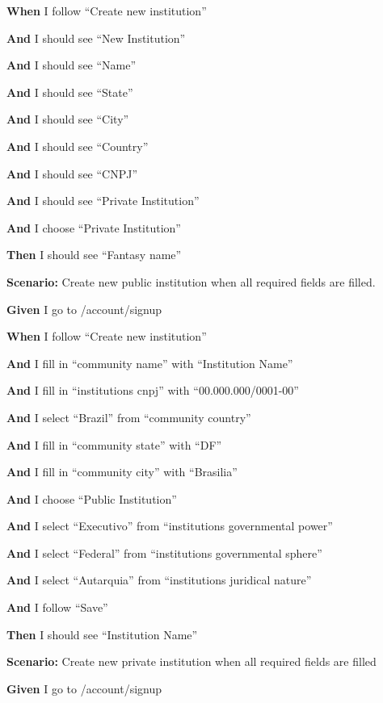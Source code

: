     \textbf{When} I follow ``Create new institution''
    
    \textbf{And }I should see ``New Institution''
    
    \textbf{And }I should see ``Name''
    
    \textbf{And }I should see ``State''
    
    \textbf{And }I should see ``City''
    
    \textbf{And }I should see ``Country''
    
    \textbf{And }I should see ``CNPJ''
    
    \textbf{And }I should see ``Private Institution''

    \textbf{And }I choose ``Private Institution''
    
    \textbf{Then} I should see ``Fantasy name''


  
  \textbf{Scenario:} Create new public institution when all required fields are filled.

    \textbf{Given} I go to /account/signup

    \textbf{When} I follow ``Create new institution''

    \textbf{And }I fill in ``community name'' with ``Institution Name''

    \textbf{And }I fill in ``institutions cnpj'' with ``00.000.000/0001-00''

    \textbf{And }I select ``Brazil'' from ``community country''

    \textbf{And }I fill in ``community state'' with ``DF''

    \textbf{And }I fill in ``community city'' with ``Brasilia''

    \textbf{And }I choose ``Public Institution''

    \textbf{And }I select ``Executivo'' from ``institutions governmental power''

    \textbf{And }I select ``Federal'' from ``institutions governmental sphere''

    \textbf{And }I select ``Autarquia'' from ``institutions juridical nature''

    \textbf{And }I follow ``Save''

    \textbf{Then} I should see ``Institution Name''


  
  \textbf{Scenario:} Create new private institution when all required fields are filled

    \textbf{Given} I go to /account/signup

